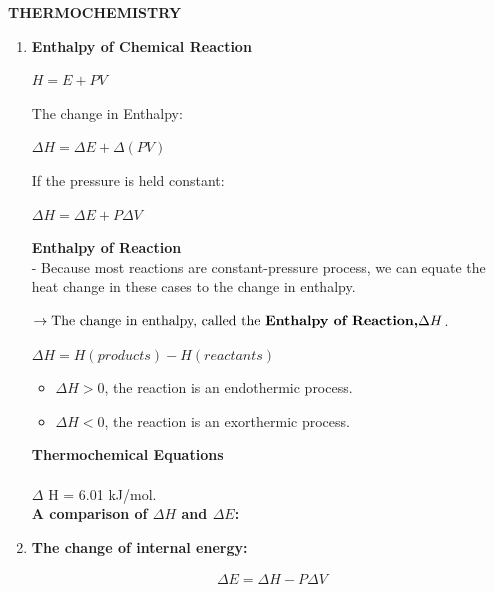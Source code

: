\documentclass[10pt]{article}
\begin{document}
\begin{center}
	\textbf{THERMOCHEMISTRY}
\end{center}
\begin{enumerate}
	\item \textbf{Enthalpy of Chemical Reaction}\\
	\begin{mybox}
	\begin{center}
	$H = E + PV$
	\end{center}
	\end{mybox}
	The change in Enthalpy:
	\begin{mybox}
	\begin{center}
	$\Delta H = \Delta E + \Delta (PV)$
	\end{center}
	\end{mybox}
	If the pressure is held constant:
	\begin{center}
	$\Delta H = \Delta E + P \Delta V$
	\end{center}
	\textbf{Enthalpy of Reaction}\\
	- Because most reactions are constant-pressure process, we can equate the heat change in these cases to the change in enthalpy.
	\begin{center}
	\end{center}
	$\rightarrow{\mbox{The change in enthalpy, called the \textbf{Enthalpy of Reaction,$\Delta H$}}}$.\\
	\begin{mybox}
	\begin{center}
	$\Delta H = H(products) - H(reactants)$
	\end{center}
	\end{mybox}
	\begin{itemize}
		\item $\Delta H >0$, the reaction is an endothermic process.
		\item $\Delta H < 0$, the reaction is an exorthermic process.
	\end{itemize}
	\textbf{Thermochemical Equations}\\
	\\
	$\Delta$ H = 6.01 kJ/mol.\\
	\textbf{A comparison of $\Delta H$ and $\Delta E$:}
	\item \textbf{The change of internal energy:}
	\begin{center}
	\begin{align}
    \Delta E = \Delta H - P \Delta V \\

\end{align}
\end{center}
\end{enumerate}
\end{document}
